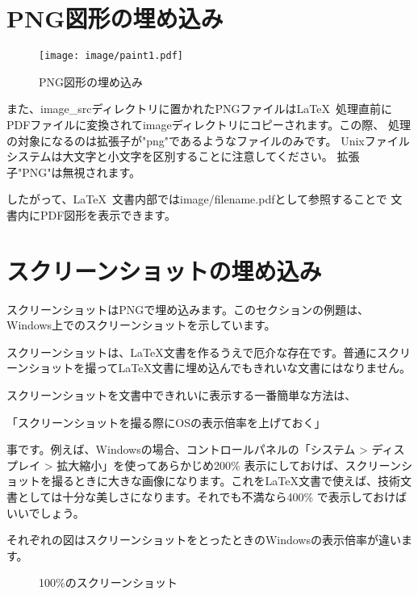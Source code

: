 \section{PNG図形の埋め込み}


\begin{wrapfigure}[10]{O}[0pt]{0\textwidth}
    \texttt{[image: image/paint1.pdf]}
    \caption{PNG図形の埋め込み}\label{embeded_png}
\end{wrapfigure}

また、image\_srcディレクトリに置かれたPNGファイルは\LaTeX\
処理直前にPDFファイルに変換されてimageディレクトリにコピーされます。この際、
処理の対象になるのは拡張子が"png"であるようなファイルのみです。
Unixファイルシステムは大文字と小文字を区別することに注意してください。
拡張子"PNG"は無視されます。

したがって、\LaTeX\ 文書内部ではimage/filename.pdfとして参照することで
文書内にPDF図形を表示できます。


\section{スクリーンショットの埋め込み}

スクリーンショットはPNGで埋め込みます。このセクションの例題は、Windows上でのスクリーンショットを示しています。

スクリーンショットは、\LaTeX 文書を作るうえで厄介な存在です。普通にスクリーンショットを撮って\LaTeX 文書に埋め込んでもきれいな文書にはなりません。

スクリーンショットを文書中できれいに表示する一番簡単な方法は、

「スクリーンショットを撮る際にOSの表示倍率を上げておく」

事です。例えば、Windowsの場合、コントロールパネルの「システム > ディスプレイ > 拡大縮小」を使ってあらかじめ200\% 表示にしておけば、スクリーンショットを撮るときに大きな画像になります。これを\LaTeX 文書で使えば、技術文書としては十分な美しさになります。それでも不満なら400\% で表示しておけばいいでしょう。

それぞれの図はスクリーンショットをとったときのWindowsの表示倍率が違います。

\begin{wrapfigure}{r}[0pt]{0.5\textwidth}
    \begin{center}
        \caption{100\%のスクリーンショット} \label{fig:sc100}
    \end{center}
\end{wrapfigure}


